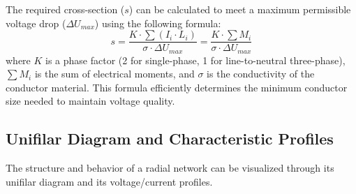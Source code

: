 \documentclass[12pt, a4paper]{article}
\begin{document}
The required cross-section ($s$) can be calculated to meet a maximum permissible voltage drop ($\Delta U_{max}$) using the following formula:
\begin{equation}
    s = \frac{K \cdot \sum (I_i \cdot L_i)}{\sigma \cdot \Delta U_{max}} = \frac{K \cdot \sum M_i}{\sigma \cdot \Delta U_{max}}
\end{equation}
where $K$ is a phase factor (2 for single-phase, 1 for line-to-neutral three-phase), $\sum M_i$ is the sum of electrical moments, and $\sigma$ is the conductivity of the conductor material. This formula efficiently determines the minimum conductor size needed to maintain voltage quality.

\subsection{Unifilar Diagram and Characteristic Profiles}
The structure and behavior of a radial network can be visualized through its unifilar diagram and its voltage/current profiles.
\end{document}
